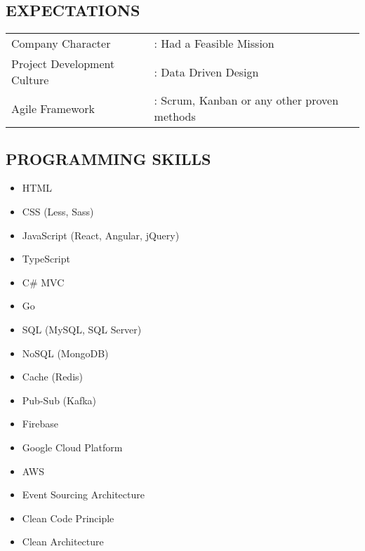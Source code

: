 \documentclass[11pt,a4paper,english]{article}
\begin{document}
\subsection*{EXPECTATIONS}
\begin{tabular}{ll}
	Company Character &: Had a Feasible Mission\\
	Project Development Culture &: Data Driven Design\\
	Agile Framework &: Scrum, Kanban or any other proven methods\\
\end{tabular}

\subsection*{PROGRAMMING SKILLS}
\begin{itemize}
	\item HTML
	\item CSS (Less, Sass)
	\item JavaScript (React, Angular, jQuery)
	\item TypeScript
	\item C\# MVC
	\item Go
	\item SQL (MySQL, SQL Server)
	\item NoSQL (MongoDB)
	\item Cache (Redis)
	\item Pub-Sub (Kafka)
	\item Firebase
	\item Google Cloud Platform
	\item AWS
	\item Event Sourcing Architecture
	\item Clean Code Principle
	\item Clean Architecture
\end{itemize}
\end{document}
